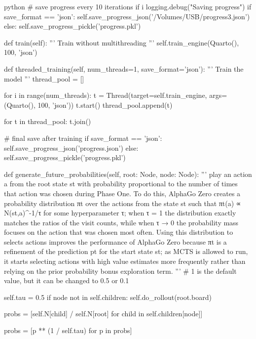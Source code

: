 \begin{mintedbox}{python}
            # save progress every 10 iterations
            if i %
                logging.debug("Saving progress")
                if save_format == 'json':
                    self.save_progress_json('/Volumes/USB/progress3.json')
                else:
                    self.save_progress_pickle('progress.pkl')

    def train(self):
        '''
        Train without multithreading
        '''
        self.train_engine(Quarto(), 100, 'json')

    def threaded_training(self, num_threads=1, save_format='json'):
        '''
        Train the model
        '''
        thread_pool = []

        for i in range(num_threads):
            t = Thread(target=self.train_engine, args=(Quarto(), 100, 'json'))
            t.start()
            thread_pool.append(t)

        for t in thread_pool:
            t.join()

        # final save after training
        if save_format == 'json':
            self.save_progress_json('progress.json')
        else:
            self.save_progress_pickle('progress.pkl')

    def generate_future_probabilities(self, root: Node, node: Node):
        '''
        play an action a from the root state st with probability proportional to the number of times that action was chosen during Phase One. To do this, AlphaGo Zero creates a probability distribution πt over the actions from the state st such that πt(a) ∝ N(st,a)^-1/τ for some hyperparameter τ; when τ = 1 the distribution exactly matches the ratios of the visit counts, while when τ → 0 the probability mass focuses on the action that was chosen most often. Using this distribution to selects actions improves the performance of AlphaGo Zero because πt is a refinement of the prediction pt for the start state st; as MCTS is allowed to run, it starts selecting actions with high value estimates more frequently rather than relying on the prior probability bonus exploration term.
        '''
        # 1 is the default value, but it can be changed to 0.5 or 0.1

        self.tau = 0.5
        if node not in self.children:
            self.do_rollout(root.board)

        probs = [self.N[child] / self.N[root]
                    for child in self.children[node]]

        probs = [p ** (1 / self.tau) for p in probs]


\end{mintedbox}
